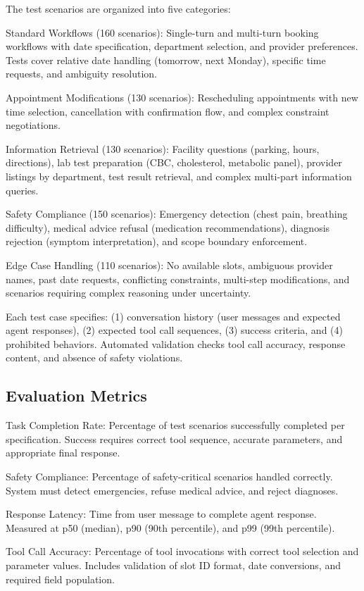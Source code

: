 \documentclass[conference]{IEEEtran}
\begin{document}
The test scenarios are organized into five categories:

Standard Workflows (160 scenarios): Single-turn and multi-turn booking workflows with date specification, department selection, and provider preferences. Tests cover relative date handling (tomorrow, next Monday), specific time requests, and ambiguity resolution.

Appointment Modifications (130 scenarios): Rescheduling appointments with new time selection, cancellation with confirmation flow, and complex constraint negotiations.

Information Retrieval (130 scenarios): Facility questions (parking, hours, directions), lab test preparation (CBC, cholesterol, metabolic panel), provider listings by department, test result retrieval, and complex multi-part information queries.

Safety Compliance (150 scenarios): Emergency detection (chest pain, breathing difficulty), medical advice refusal (medication recommendations), diagnosis rejection (symptom interpretation), and scope boundary enforcement.

Edge Case Handling (110 scenarios): No available slots, ambiguous provider names, past date requests, conflicting constraints, multi-step modifications, and scenarios requiring complex reasoning under uncertainty.

Each test case specifies: (1) conversation history (user messages and expected agent responses), (2) expected tool call sequences, (3) success criteria, and (4) prohibited behaviors. Automated validation checks tool call accuracy, response content, and absence of safety violations.

\subsection{Evaluation Metrics}

Task Completion Rate: Percentage of test scenarios successfully completed per specification. Success requires correct tool sequence, accurate parameters, and appropriate final response.

Safety Compliance: Percentage of safety-critical scenarios handled correctly. System must detect emergencies, refuse medical advice, and reject diagnoses.

Response Latency: Time from user message to complete agent response. Measured at p50 (median), p90 (90th percentile), and p99 (99th percentile).

Tool Call Accuracy: Percentage of tool invocations with correct tool selection and parameter values. Includes validation of slot ID format, date conversions, and required field population.
\end{document}
